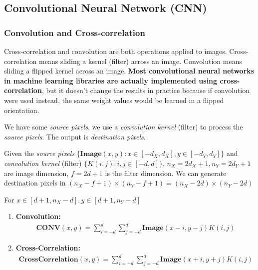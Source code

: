 \documentclass[11pt,a4paper]{article}
\begin{document}
\subsection{Convolutional Neural Network (CNN)}
\subsubsection{Convolution and Cross-correlation}
Cross-correlation and convolution are both operations applied to images. Cross-correlation means sliding a kernel (filter) across an image. Convolution means sliding a flipped kernel across an image. \textbf{Most convolutional neural networks in machine learning libraries are actually implemented using cross-correlation}, but it doesn't change the results in practice because if convolution were used instead, the same weight values would be learned in a flipped orientation.

We have some \textit{source pixels}, we use a \textit{convolution kernel} (filter) to process the \textit{source pixels}. The output is \textit{destination pixels}.

Given the \textit{source pixels} $\{\textbf{Image}(x,y):x\in [-d_X,d_X],y\in [-d_Y,d_Y]\}$ and \textit{convolution kernel} (filter) $\{K(i,j):i,j\in[-d,d]\}$. $n_X=2d_X+1,n_Y=2d_Y+1$ are image dimension, $f=2d+1$ is the filter dimension. We can generate destination pixels in $(n_X-f+1)\times (n_Y-f+1) = (n_X-2d)\times (n_Y-2d)$

For $x\in [d+1,n_X-d],y\in [d+1,n_Y-d]$
\begin{enumerate}
    \item \textbf{Convolution:}
    \begin{equation}
        \begin{aligned}
            \textbf{CONV}(x,y)=\sum_{i=-d}^d\sum_{j=-d}^d \textbf{Image}(x-i,y-j)K(i,j)
        \end{aligned}
        \nonumber
    \end{equation}
    \item \textbf{Cross-Correlation:}
    \begin{equation}
        \begin{aligned}
            \textbf{CrossCorrelation}(x,y)=\sum_{i=-d}^d\sum_{j=-d}^d \textbf{Image}(x+i,y+j)K(i,j)
        \end{aligned}
        \nonumber
    \end{equation}
\end{enumerate}
\end{document}
